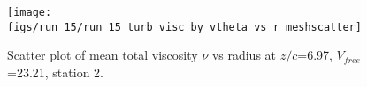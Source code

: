 \begin{figure}[H]
\centering
\texttt{[image: figs/run\_15/run\_15\_turb\_visc\_by\_vtheta\_vs\_r\_meshscatter]}
\caption{Scatter plot of mean total viscosity $\nu$ vs radius at $z/c$=6.97, $V_{free}$=23.21, station 2.}
\label{fig:run_15_turb_visc_by_vtheta_vs_r_meshscatter}
\end{figure}


